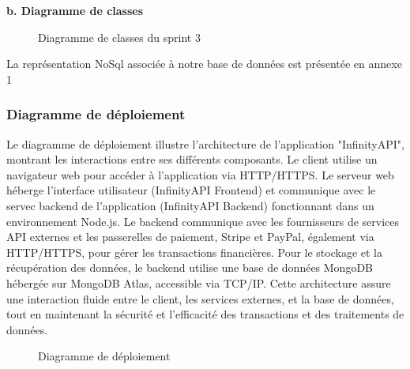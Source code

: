 \textbf{b. Diagramme de classes } \\

\begin{figure}[H]
    \centering
    \caption{Diagramme de classes du sprint 3    }
    \label{fig:logo_tt}
\end{figure}
La représentation NoSql associée à notre base de données est présentée en annexe 1

\subsubsection{Diagramme de déploiement}

Le diagramme de déploiement illustre l'architecture de l'application "InfinityAPI", montrant les interactions entre ses différents composants. Le client utilise un navigateur web pour accéder à l'application via HTTP/HTTPS. Le serveur web héberge l'interface utilisateur (InfinityAPI Frontend) et communique avec le servec backend de l'application (InfinityAPI Backend) fonctionnant dans un environnement Node.js. Le backend communique avec les fournisseurs de services API externes et les passerelles de paiement, Stripe et PayPal, également via HTTP/HTTPS, pour gérer les transactions financières. Pour le stockage et la récupération des données, le backend utilise une base de données MongoDB hébergée sur MongoDB Atlas, accessible via TCP/IP. Cette architecture assure une interaction fluide entre le client, les services externes, et la base de données, tout en maintenant la sécurité et l'efficacité des transactions et des traitements de données.
\begin{figure}[H]
    \centering
    \caption{Diagramme de déploiement}
    \label{fig:logo_tt}
\end{figure}
\pagebreak


